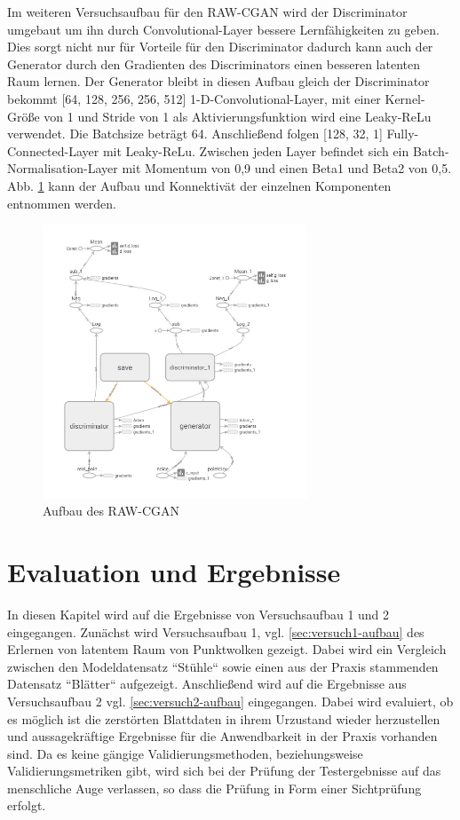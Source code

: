 \documentclass{llncs}
\begin{document}
Im weiteren Versuchsaufbau für den RAW-CGAN wird der Discriminator umgebaut um ihn durch Convolutional-Layer bessere Lernfähigkeiten zu geben. Dies sorgt nicht nur für Vorteile für den Discriminator dadurch kann auch der Generator durch den Gradienten des Discriminators einen besseren latenten Raum lernen. Der Generator bleibt in diesen Aufbau gleich der Discriminator bekommt [64, 128, 256, 256, 512] 1-D-Convolutional-Layer, mit einer Kernel-Größe von 1 und Stride von 1 als Aktivierungsfunktion wird eine Leaky-ReLu verwendet. Die Batchsize beträgt 64. Anschließend folgen [128, 32, 1] Fully-Connected-Layer mit Leaky-ReLu. Zwischen jeden Layer befindet sich ein Batch-Normalisation-Layer mit Momentum von 0,9 und einen Beta1 und Beta2 von 0,5. Abb. \ref{fig:Bild55} kann der Aufbau und Konnektivät der einzelnen Komponenten entnommen werden.

\begin{figure}[htbp] 
	\centering
	\includegraphics[width=0.7\textwidth]{point-cgan.png}
	\caption{Aufbau des RAW-CGAN}
	\label{fig:Bild55}
\end{figure}
\newpage

\section{Evaluation und Ergebnisse}

In diesen Kapitel wird auf die Ergebnisse von Versuchsaufbau 1 und 2 eingegangen. Zunächst wird Versuchsaufbau 1, vgl. \ref{sec:versuch1-aufbau} des Erlernen von latentem Raum von Punktwolken gezeigt. Dabei wird ein Vergleich zwischen den Modeldatensatz ``Stühle`` sowie einen aus der Praxis stammenden Datensatz ``Blätter`` aufgezeigt. Anschließend wird auf die Ergebnisse aus Versuchsaufbau 2 vgl. \ref{sec:versuch2-aufbau} eingegangen. Dabei wird evaluiert, ob es möglich ist die zerstörten Blattdaten in ihrem Urzustand wieder herzustellen und aussagekräftige Ergebnisse für die Anwendbarkeit in der Praxis vorhanden sind. Da es keine gängige Validierungsmethoden, beziehungsweise Validierungsmetriken gibt, wird sich bei der Prüfung der Testergebnisse auf das menschliche Auge verlassen, so dass die Prüfung in Form einer Sichtprüfung erfolgt.
\end{document}
